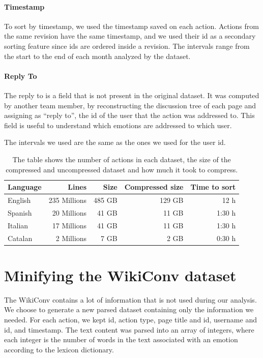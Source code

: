 \paragraph*{Timestamp}
To sort by timestamp, we used the timestamp saved on each action. Actions from the same revision have the same timestamp, and we used their id as a secondary sorting feature since ids are ordered inside a revision. The intervals range from the start to the end of each month analyzed by the dataset.

\paragraph*{Reply To}
The reply to is a field that is not present in the original dataset. It was computed by another team member, by reconstructing the discussion tree of each page and assigning as “reply to”, the id of the user that the action was addressed to. This field is useful to understand which emotions are addressed to which user.

The intervals we used are the same as the ones we used for the user id.


\begin{table}[H]
    \centering
    \begin{tabularx}{\columnwidth}{@{}Xrrrr@{}}
        \midrule
        \textbf{Language} & \textbf{Lines} & \textbf{Size} & \textbf{Compressed size} & \textbf{Time to sort}\\ \toprule
        English & 235 Millions & 485 GB & 129 GB & 12 h \\
        Spanish & 20 Millions & 41 GB & 11 GB & 1:30 h \\
        Italian & 17 Millions & 41 GB & 11 GB & 1:30 h \\
        Catalan & 2 Millions & 7 GB & 2 GB & 0:30 h \\

         \bottomrule
    \end{tabularx}
    
    \caption{The table shows the number of actions in each dataset, the size of the compressed and uncompressed dataset and how much it took to compress.  \label{table:datasetsize}}
\end{table}


\section{Minifying the WikiConv dataset}
\label{sec:minifingthewikiconvdataset}
The WikiConv contains a lot of information that is not used during our analysis. We choose to generate a new parsed dataset containing only the information we needed. For each action, we kept id, action type, page title and id, username and id, and timestamp. The text content was parsed into an array of integers, where each integer is the number of words in the text associated with an emotion according to the lexicon dictionary.

